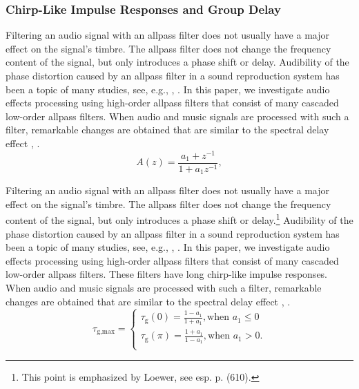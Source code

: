 \documentclass{aes2e}
\begin{document}
\subsubsection{Chirp-Like Impulse Responses and Group Delay}
Filtering an audio signal with an allpass filter does not usually have a major effect on the signal's timbre. The allpass filter does not change the frequency content of the signal, but only introduces a phase shift or delay. Audibility of the phase distortion caused by an allpass filter in a sound reproduction system has been a topic of many studies, see, e.g., \cite{DEK1}, \cite{DEK2}. In this paper, we investigate audio effects processing using high-order allpass filters that consist of many cascaded low-order allpass filters.  When audio and music signals are processed with such a filter, remarkable changes are obtained that are similar to the spectral delay effect  \cite{DEK3}, \cite{DEK4}.
\begin{equation}
A(z) = \frac{{a_1  + z^{ - 1} }}{{1 + a_1 z^{ - 1} }},
\end{equation}



Filtering an audio signal with an allpass filter does not usually have a major effect on the signal's timbre. The allpass filter does not change the frequency content of the \nobreak signal, but only introduces a phase shift or delay.\footnote{This point is emphasized by Loewer, see esp. p. (610).} Audibility of the phase distortion caused by an allpass filter in a sound reproduction system has been a topic of many studies, see, e.g., \cite{DEK1}, \cite{DEK2}. In this paper, we investigate audio effects processing using high-order allpass filters that consist of many cascaded low-order allpass filters. These filters have long chirp-like impulse responses. When audio and music signals are processed with such a filter, remarkable changes are obtained that are similar to the spectral delay effect  \cite{DEK3}, \cite{DEK4}.
\begin{equation}
\tau _{\textrm{g,max}}  = \left\{ \begin{array}{l}
 \tau _\textrm{g} (0) = \frac{{1 - a_1 }}{{1 + a_1 }},\textrm{when }a_1  \le 0 \\[4pt]
 \tau _\textrm{g} (\pi ) = \frac{{1 + a_1 }}{{1 - a_1 }},\textrm{when }a_1  > 0. \\
 \end{array} \right.\end{equation}
\end{document}
